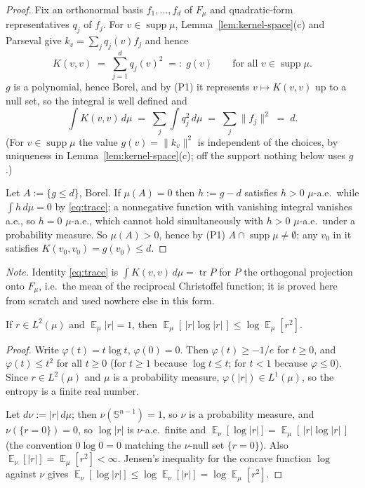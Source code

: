 \documentclass{aicr-solution}
\newcommand{\Expect}{\operatorname*{\mathbb{E}}}
\newcommand{\Sph}{\mathbb{S}^{n-1}}
\newcommand{\supp}{\operatorname{supp}}
\begin{document}
\begin{proof}
Fix an orthonormal basis $f_{1},\dots,f_{d}$ of $F_{\mu}$ and
quadratic-form representatives $q_{j}$ of $f_{j}$. For $v \in
\supp\mu$, Lemma~\ref{lem:kernel-space}(c) and Parseval give $k_{v} =
\sum_{j} q_{j}(v) f_{j}$ and hence
\begin{equation}\label{eq:christoffel}
  K(v,v) \;=\; \sum_{j=1}^{d} q_{j}(v)^{2} \;=:\; g(v) \qquad
  \text{for all } v \in \supp\mu.
\end{equation}
$g$ is a polynomial, hence Borel, and by (P1) it represents $v \mapsto
K(v,v)$ up to a null set, so the integral is well defined and
\begin{equation}\label{eq:trace}
  \int K(v,v)\,d\mu \;=\; \sum_{j} \int q_{j}^{2}\,d\mu \;=\; \sum_{j}
  \|f_{j}\|^{2} \;=\; d.
\end{equation}
(For $v \in \supp\mu$ the value $g(v) = \|k_{v}\|^{2}$ is independent
of the choices, by uniqueness in Lemma~\ref{lem:kernel-space}(c); off
the support nothing below uses $g$.)

Let $A := \{g \le d\}$, Borel. If $\mu(A) = 0$ then $h := g-d$
satisfies $h>0$ $\mu$-a.e.\ while $\int h\,d\mu = 0$ by
\eqref{eq:trace}; a nonnegative function with vanishing integral
vanishes a.e., so $h=0$ $\mu$-a.e., which cannot hold simultaneously
with $h>0$ $\mu$-a.e.\ under a probability measure. So $\mu(A) > 0$,
hence by (P1) $A \cap \supp\mu \ne \emptyset$; any $v_{0}$ in it
satisfies $K(v_{0},v_{0}) = g(v_{0}) \le d$.
\end{proof}

\smallskip
\noindent\emph{Note.} Identity \eqref{eq:trace} is $\int K(v,v)\,d\mu
= \operatorname{tr} P$ for $P$ the orthogonal projection onto
$F_{\mu}$, i.e.\ the mean of the reciprocal Christoffel function; it
is proved here from scratch and used nowhere else in this form.

\begin{lemma}\label{lem:entropy-bound}
If $r \in L^{2}(\mu)$ and $\Expect_{\mu}|r| = 1$, then $\Expect_{\mu}
[\,|r|\log|r|\,] \le \log \Expect_{\mu}[r^{2}]$.
\end{lemma}

\begin{proof}
Write $\varphi(t) = t\log t$, $\varphi(0) = 0$. Then $\varphi(t) \ge
-1/e$ for $t \ge 0$, and $\varphi(t) \le t^{2}$ for all $t \ge 0$ (for
$t \ge 1$ because $\log t \le t$; for $t<1$ because $\varphi \le 0$).
Since $r \in L^{2}(\mu)$ and $\mu$ is a probability measure,
$\varphi(|r|) \in L^{1}(\mu)$, so the entropy is a finite real number.

Let $d\nu := |r|\,d\mu$; then $\nu(\Sph) = 1$, so $\nu$ is a
probability measure, and $\nu(\{r=0\}) = 0$, so $\log|r|$ is
$\nu$-a.e.\ finite and $\Expect_{\nu}[\log|r|] = \Expect_{\mu}
[\,|r|\log|r|\,]$ (the convention $0\log 0 = 0$ matching the
$\nu$-null set $\{r=0\}$). Also $\Expect_{\nu}[|r|] =
\Expect_{\mu}[r^{2}] < \infty$. Jensen's inequality for the concave
function $\log$ against $\nu$ gives $\Expect_{\nu}[\log|r|] \le \log
\Expect_{\nu}[|r|] = \log \Expect_{\mu}[r^{2}]$.
\end{proof}
\end{document}
